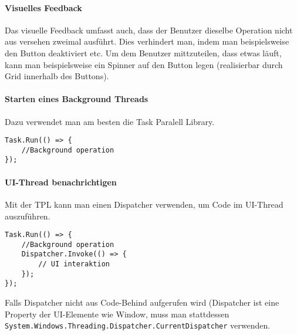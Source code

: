 \paragraph{Visuelles Feedback} Das visuelle Feedback umfasst auch, dass der Benutzer dieselbe Operation nicht aus versehen zweimal ausführt. Dies verhindert man, indem man beispielsweise den Button deaktiviert etc. Um dem Benutzer mittzuteilen, dass etwas läuft, kann man beispielsweise ein Spinner auf den Button legen (realisierbar durch Grid innerhalb des Buttons). 
\paragraph{Starten eines Background Threads} Dazu verwendet man am besten die Task Paralell Library. 
\begin{lstlisting}
Task.Run(() => {
    //Background operation
});
\end{lstlisting}
\paragraph{UI-Thread benachrichtigen} Mit der TPL kann man einen Dispatcher verwenden, um Code im UI-Thread auszuführen.
\begin{lstlisting}
Task.Run(() => {
    //Background operation
    Dispatcher.Invoke(() => {
        // UI interaktion
    });
});
\end{lstlisting}
Falls Dispatcher nicht aus Code-Behind aufgerufen wird (Dispatcher ist eine Property der UI-Elemente wie Window, muss man stattdessen \verb+System.Windows.Threading.Dispatcher.CurrentDispatcher+ verwenden.